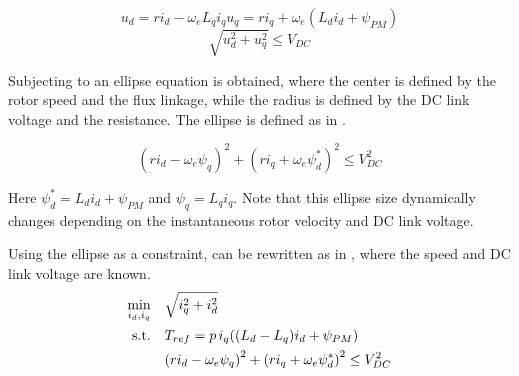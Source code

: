 \begin{subequations}
	\begin{equation}
		u_d = r i_d -\omega_e L_q i_q
	\end{equation}
	\begin{equation}
		u_q =  r i_q + \omega_e (L_d i_d +\psi_{PM})
	\end{equation}
    \label{eq:voltage_constraint_model} %
\end{subequations}
\begin{equation}
	\sqrt{u_d^2+u_q^2}\leq V_{DC}
    \label{eq:voltage_constraint_vdc} %
\end{equation}

Subjecting  to  an ellipse equation is obtained, where the center is defined by the rotor speed and the flux linkage, while the radius is defined by the DC link voltage and the resistance. The ellipse is defined as in .

\begin{equation}
	{(r i_d -\omega_e \psi_q)}^2 + {(r i_q + \omega_e \psi^*_d)}^2\leq V_{DC}^2
	\label{eq:voltage_ellipse} %
\end{equation}

Here $\psi^*_d = L_d i_d + \psi_{PM}$ and $\psi_q = L_q i_q$. Note that this ellipse size dynamically changes depending on the instantaneous rotor velocity and DC link voltage.

Using the ellipse as a constraint,  can be rewritten as in , where the speed and DC link voltage are known.
\begin{equation}
	\begin{aligned}
		\min_{i_d,i_q} \quad & \sqrt{i_q^2 + i_d^2} \\
		\rm{s.t.}  \quad & T_{ref} = p\, i_q((L_d - L_q)i_d + \psi_{PM})\\
		               \quad & {(r i_d -\omega_e \psi_q)}^2 + {(r i_q + \omega_e \psi^*_d)}^2\leq V_{DC}^2            \\
	\end{aligned}
	\label{eq:mtpa_problem_with_voltage_constraint} %
\end{equation}

